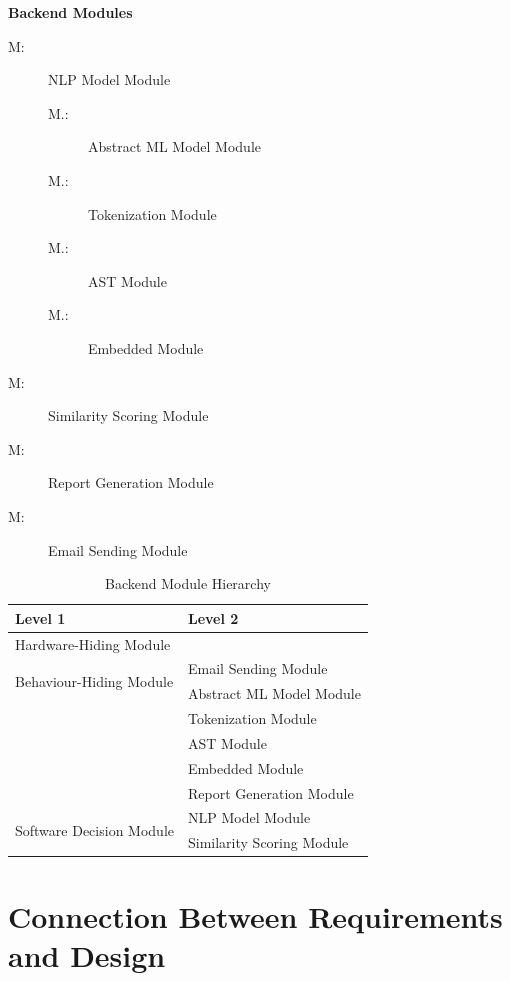 \documentclass[12pt, titlepage]{article}
\newcounter{mnum}
\newcommand{\mthemnum}{M\themnum}
\newcounter{smnum}[mnum]
\newcommand{\smthemnum}{\mthemnum.\thesmnum}
\begin{document}
\textbf{Backend Modules}
\begin{description}
  \item [ \mthemnum \label{mNLP}:] NLP Model Module
  \begin{description}
    \item [ \smthemnum \label{smMLModel}:] Abstract ML Model Module
    \item [ \smthemnum \label{smTokenization}:] Tokenization Module
    \item [ \smthemnum \label{smAST}:] AST Module
    \item [ \smthemnum \label{smEmbedded}:] Embedded Module
  \end{description}
  \item [ \mthemnum \label{mScoring}:] Similarity Scoring Module
  \item [ \mthemnum \label{mReport}:] Report Generation Module
  \item [ \mthemnum \label{mEmail}:] Email Sending Module
\end{description}

\begin{table}[h!]
  \centering
  \begin{tabular}{p{} p{}}
  \toprule
  \textbf{Level 1} & \textbf{Level 2} \\
  \midrule
  {Hardware-Hiding Module} & ~ \\
  \midrule
  \multirow{2}{*}{Behaviour-Hiding Module} & Email Sending Module \\
  & Abstract ML Model Module \\
  & Tokenization Module \\
  & AST Module \\
  & Embedded Module \\
  & Report Generation Module \\
  \midrule
  \multirow{2}{*}{Software Decision Module} & NLP Model Module \\
  & Similarity Scoring Module \\
  \bottomrule
  \end{tabular}
  \caption{Backend Module Hierarchy}
  \label{TblBMH}
\end{table}

\section{Connection Between Requirements and Design} \label{SecConnection}
\end{document}
